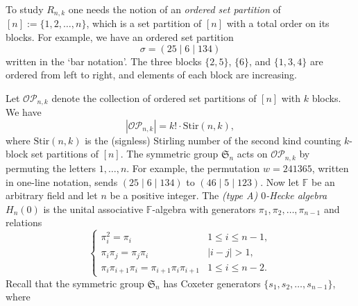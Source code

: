 \documentclass[10pt]{amsart}
\theoremstyle{definition}
\newcommand{\Stir}{{\mathrm {Stir}}}
\newcommand{\symm}{{\mathfrak{S}}}
\newcommand{\OP}{{\mathcal{OP}}}
\newcommand{\FF}{{\mathbb{F}}}
\newcommand{\pib}{\overline{\pi}}
\begin{document}
To study $R_{n,k}$ one needs the notion of an \emph{ordered set partition} of $[n] := \{1, 2, \dots, n\}$, which is a set partition of $[n]$ with a total order on its blocks.
For example, we have an ordered set partition
\begin{equation*}
\sigma = (25 \mid 6 \mid 134)
\end{equation*}
written in the `bar notation'. The three blocks $\{2,5\}$, $\{6\}$, and $\{1,3,4\}$ are ordered from left to right, and elements of each block are increasing.

Let $\OP_{n,k}$ denote the collection of ordered set partitions of $[n]$ with $k$ blocks.  We have
\begin{equation}
|\OP_{n,k}| = k! \cdot \Stir(n,k),
\end{equation}
where $\Stir(n,k)$ is the (signless) Stirling number of the second kind counting $k$-block
set partitions of $[n]$.
The symmetric group $\symm_n$ acts on $\OP_{n,k}$ by permuting the letters $1,\ldots,n$.  For example, the permutation $w=241365$, written in one-line notation, sends $(25 \mid 6 \mid 134)$ to $(46 \mid 5 \mid 123)$.
Now let $\FF$ be an arbitrary field and let $n$ be a positive integer.  
The 
\emph{(type A) $0$-Hecke algebra} $H_n(0)$ 
is the unital associative $\FF$-algebra with generators $\pi_1, \pi_2, \dots, \pi_{n-1}$ and relations
\begin{equation}
\label{zero-hecke-relations}
\begin{cases}
\pi_i^2 =  \pi_i & 1 \leq i \leq n-1, \\
\pi_i \pi_j = \pi_j \pi_i & |i - j| > 1,  \\
\pi_i \pi_{i+1} \pi_i = \pi_{i+1} \pi_i \pi_{i+1} & 1 \leq i \leq n-2.
\end{cases}
\end{equation}
Recall that the symmetric group $\symm_n$ has Coxeter generators $\{s_1, s_2, \dots, s_{n-1} \}$, where
\end{document}
